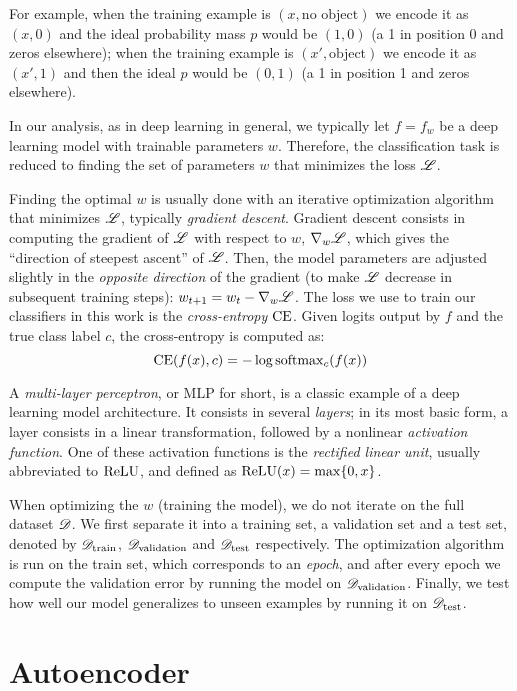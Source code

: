 \documentclass[../main.tex]{subfiles}
\begin{document}
For example, when the training example is $(x, \text{no object})$ we encode it as $(x, 0)$ and the ideal probability mass $p$
would be $(1, 0)$ (a 1 in position 0 and zeros elsewhere);
when the training example is $(x', \text{object})$ we encode it as $(x', 1)$ and then the ideal $p$ would be $(0, 1)$ (a 1
in position 1 and zeros elsewhere).

In our analysis, as in deep learning in general, we typically let $f = f_w$ be a deep learning model with trainable parameters $w$.
Therefore, the classification task is reduced to finding the set of parameters $w$ that minimizes
the loss $\mathscr{L}$.

Finding the optimal $w$ is usually done with an iterative optimization algorithm that minimizes $\mathscr{L}$, typically \emph{gradient descent}.
Gradient descent consists in computing the gradient of $\mathscr{L}$ with respect to $w$, $\nabla_{w} \mathscr{L}$, which gives the ``direction of steepest ascent'' of $\mathscr{L}$.
Then, the model parameters are adjusted slightly in the \emph{opposite direction} of the gradient (to make $\mathscr{L}$ decrease in subsequent training steps): $w_{t+1} = w_t - \nabla_w \mathscr{L}$.
The loss we use to train our classifiers in this work is the \emph{cross-entropy} $\text{CE}$.
Given logits output by $f$ and the true class label $c$, the cross-entropy is computed as:
\begin{equation}
\text{CE}(f(x), c) = - \log \mathrm{softmax}_c(f(x))
\end{equation}

A \emph{multi-layer perceptron}, or MLP for short, is a classic example of a deep learning model architecture.
It consists in several \emph{layers}; in its most basic form, a layer consists in a linear transformation,
followed by a nonlinear \emph{activation function}.
One of these activation functions is the \emph{rectified linear unit}, usually abbreviated to $\text{ReLU}$, and defined as $\text{ReLU}(x) = \max\{0, x\}$.

When optimizing the $w$ (training the model), we do not iterate on the full dataset $\mathscr{D}$.
We first separate it into a training set, a validation set and a test set, denoted by $\mathscr{D}_\text{train}$, $\mathscr{D}_\text{validation}$ and $\mathscr{D}_\text{test}$ respectively.
The optimization algorithm is run on the train set, which corresponds to an \emph{epoch}, and after every epoch we compute the validation error by running the model on $\mathscr{D}_\text{validation}$.
Finally, we test how well our model generalizes to unseen examples by running it on $\mathscr{D}_\text{test}$.

\section{Autoencoder}
\end{document}
